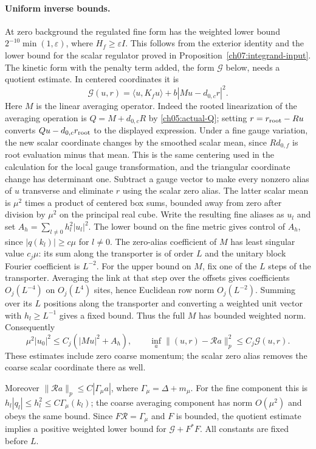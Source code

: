 \paragraph{Uniform inverse bounds.}
At zero background the regulated fine form has the weighted lower bound
$2^{-10}\min(1,\varepsilon)$, where $H_f\ge\varepsilon I$.
This follows from the exterior identity and the lower bound for the scalar regulator
proved in Proposition~\ref{ch07:integrand-input}. The kinetic form with the penalty
term added, the form $\mathcal G$ below, needs a quotient estimate. In centered coordinates it is
\[
 \mathcal G(u,r)=\langle u,K_fu\rangle
                         +b|M u-d_{0,c}r|^2.
\]
Here $M$ is the linear averaging operator. Indeed the rooted
linearization of the averaging operation is $Q=M+d_{0,c}R$ by \eqref{ch05:actual-Q}; setting
$r=r_{\rm root}-Ru$ converts $Qu-d_{0,c}r_{\rm root}$ to the
displayed expression. Under a fine gauge variation, the new scalar
coordinate changes by the smoothed scalar mean, since
$R d_{0,f}$ is root evaluation minus that mean. This is the same
centering used in the calculation for the local gauge transformation, and the triangular coordinate
change has determinant one.
Subtract a gauge vector to make every nonzero alias of $u$
transverse and eliminate $r$ using the scalar zero alias. The
latter scalar mean is $\mu^2$ times a product of centered box sums,
bounded away from zero after division by $\mu^2$ on the principal
real cube. Write the resulting fine aliases as $u_l$ and set
$A_h=\sum_{l\ne0}h_l^2|u_l|^2$. The lower bound on the fine metric gives control
of $A_h$, since $|q(k_l)|\ge c\mu$ for $l\ne0$.
The zero-alias coefficient of $M$ has least singular value $c_j\mu$:
its sum along the transporter is of order $L$ and the unitary block Fourier
coefficient is $L^{-2}$. For the upper bound on $M$, fix one of the $L$
steps of the transporter. Averaging the link at that step over the offsets gives coefficients
$O_j(L^{-4})$ on $O_j(L^4)$ sites, hence Euclidean row norm
$O_j(L^{-2})$. Summing over its $L$ positions along the transporter and converting
a weighted unit vector with $h_l\ge L^{-1}$ gives a fixed bound.
Thus the full $M$ has bounded weighted norm.
Consequently
\[
 \mu^2|u_0|^2\le C_j(|Mu|^2+A_h),
 \qquad
 \inf_a\|(u,r)-\mathcal R a\|_p^2\le C_j\mathcal G(u,r).
\]
These estimates include zero coarse momentum; the scalar zero
alias removes the coarse scalar coordinate there as well.

Moreover $\|\mathcal R a\|_p\le C|\Gamma_\mu a|$, where
$\Gamma_\mu=\Delta+m_\mu$. For the fine component this is
$h_l|q_l|\le h_l^2\le C\Gamma_\mu(k_l)$; the coarse averaging
component has norm $O(\mu^2)$ and obeys the same bound. Since
$F\mathcal R=\Gamma_\mu$ and $F$ is bounded, the quotient estimate
implies a positive weighted lower bound for $\mathcal G+F^*F$.
All constants are fixed before $L$.

